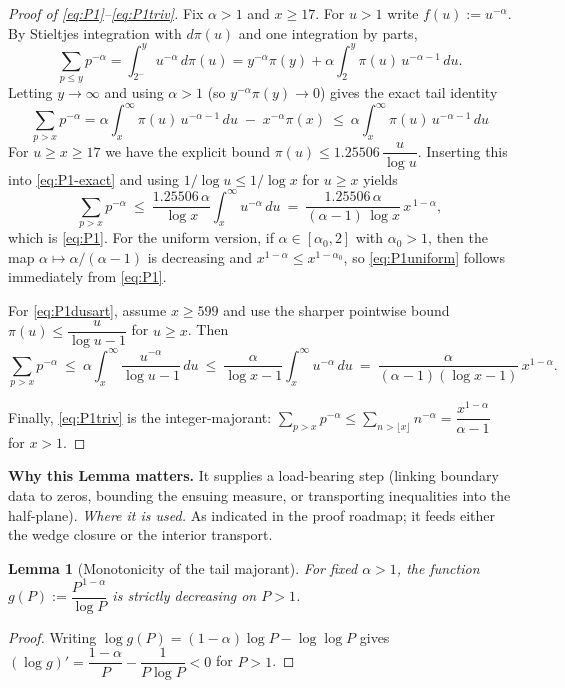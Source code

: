 \documentclass[11pt]{article}
\newtheorem{lemma}{Lemma}[section]
\theoremstyle{definition}
\theoremstyle{remark}
\begin{document}
\begin{proof}[Proof of \eqref{eq:P1}--\eqref{eq:P1triv}]
Fix $\alpha>1$ and $x\ge 17$. For $u>1$ write $f(u):=u^{-\alpha}$. By Stieltjes integration with $d\pi(u)$ and one integration by parts,
\[
\sum_{p\le y} p^{-\alpha}
=\int_{2^-}^{y} u^{-\alpha}\,d\pi(u)
= y^{-\alpha}\pi(y)+\alpha\!\int_{2}^{y} \pi(u)\,u^{-\alpha-1}\,du.
\]
Letting $y\to\infty$ and using $\alpha>1$ (so $y^{-\alpha}\pi(y)\to 0$) gives the exact tail identity
\begin{equation}\label{eq:P1-exact}
\sum_{p>x} p^{-\alpha}
=\alpha\!\int_{x}^{\infty}\!\pi(u)\,u^{-\alpha-1}\,du\;-\;x^{-\alpha}\pi(x)
\ \le\ \alpha\!\int_{x}^{\infty}\!\pi(u)\,u^{-\alpha-1}\,du
\end{equation}
For $u\ge x\ge 17$ we have the explicit bound $\pi(u)\le 1.25506\,\dfrac{u}{\log u}$. Inserting this into \eqref{eq:P1-exact} and using $1/\log u\le 1/\log x$ for $u\ge x$ yields
\[
\sum_{p>x} p^{-\alpha}
\ \le\ \frac{1.25506\,\alpha}{\log x}\!\int_{x}^{\infty}\!u^{-\alpha}\,du
\ =\ \frac{1.25506\,\alpha}{(\alpha-1)\,\log x}\,x^{\,1-\alpha},
\]
which is \eqref{eq:P1}. For the uniform version, if $\alpha\in[\alpha_0,2]$ with $\alpha_0>1$, then the map $\alpha\mapsto \alpha/(\alpha-1)$ is decreasing and $x^{1-\alpha}\le x^{1-\alpha_0}$, so \eqref{eq:P1uniform} follows immediately from \eqref{eq:P1}.

For \eqref{eq:P1dusart}, assume $x\ge 599$ and use the sharper pointwise bound $\pi(u)\le \dfrac{u}{\log u-1}$ for $u\ge x$. Then
\[
\sum_{p>x} p^{-\alpha}
\ \le\ \alpha\!\int_{x}^{\infty}\!\frac{u^{-\alpha}}{\log u-1}\,du
\ \le\ \frac{\alpha}{\log x-1}\!\int_{x}^{\infty}\!u^{-\alpha}\,du
\ =\ \frac{\alpha}{(\alpha-1)(\log x-1)}\,x^{1-\alpha}.
\]

Finally, \eqref{eq:P1triv} is the integer-majorant: $\sum_{p>x}p^{-\alpha}\le \sum_{n>\lfloor x\rfloor}n^{-\alpha}=\dfrac{x^{1-\alpha}}{\alpha-1}$ for $x>1$.
\end{proof}





\vspace{1.0cm}
\noindent\textbf{Why this Lemma matters.} It supplies a load-bearing step (linking boundary data to zeros, bounding the ensuing measure, or transporting inequalities into the half-plane).
\noindent\textit{Where it is used.} As indicated in the proof roadmap; it feeds either the wedge closure or the interior transport.
\begin{lemma}[Monotonicity of the tail majorant]
\label{lem:P1-monotone}
For fixed $\alpha>1$, the function $g(P):=\dfrac{P^{\,1-\alpha}}{\log P}$ is strictly decreasing on $P>1$.
\end{lemma}
\begin{proof}
Writing $\log g(P)=(1-\alpha)\log P-\log\log P$ gives
$(\log g)'=\dfrac{1-\alpha}{P}-\dfrac{1}{P\log P}<0$ for $P>1$.
\end{proof}
\end{document}
